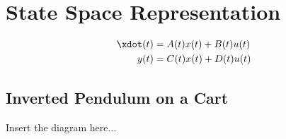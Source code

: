 \documentclass[10pt]{article}
\title{}
\author{}
\date{\today}
\begin{document}
\maketitle


\section{State Space Representation}
\begin{align}
  \xdot(t) &= A(t) x(t) + B(t)u(t)\\
  y(t)     &= C(t) x(t) + D(t)u(t)
\end{align}

\subsection{Inverted Pendulum on a Cart}

Insert the diagram here...
\end{document}
